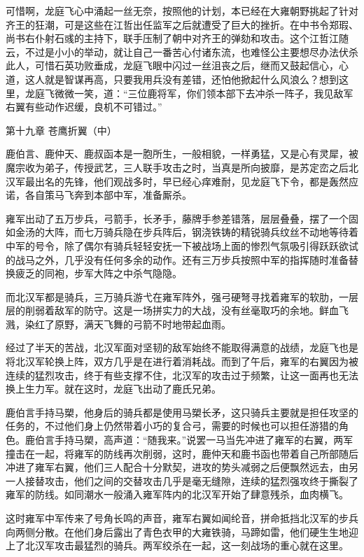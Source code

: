 可惜啊，龙庭飞心中涌起一丝无奈，按照他的计划，本已经在大雍朝野挑起了针对齐王的狂潮，可是这些在江哲出任监军之后就遭受了巨大的挫折。在中书令郑瑕、尚书右仆射石彧的主持下，联手压制了朝中对齐王的弹劾和攻击。这个江哲江随云，不过是小小的举动，就让自己一番苦心付诸东流，也难怪公主要想尽办法伏杀此人，可惜石英功败垂成，龙庭飞眼中闪过一丝沮丧之后，继而又鼓起信心，心道，这人就是智谋再高，只要我用兵没有差错，还怕他掀起什么风浪么？想到这里，龙庭飞微微一笑，道：“三位鹿将军，你们领本部下去冲杀一阵子，我见敌军右翼有些动作迟缓，良机不可错过。”

第十九章    苍鹰折翼（中）

鹿伯言、鹿仲天、鹿叔函本是一胞所生，一般相貌，一样勇猛，又是心有灵犀，被魔宗收为弟子，传授武艺，三人联手攻击之时，当真是所向披靡，是苏定峦之后北汉军最出名的先锋，他们观战多时，早已经心痒难耐，见龙庭飞下令，都是轰然应诺，各自策马飞奔到本部中军，准备厮杀。

雍军出动了五万步兵，弓箭手，长矛手，藤牌手参差错落，层层叠叠，摆了一个固如金汤的大阵，而七万骑兵隐在步兵阵后，钢浇铁铸的精锐骑兵纹丝不动地等待着中军的号令，除了偶尔有骑兵轻轻安抚一下被战场上面的惨烈气氛吸引得跃跃欲试的战马之外，几乎没有任何多余的动作。还有三万步兵按照中军的指挥随时准备替换疲乏的同袍，步军大阵之中杀气隐隐。

而北汉军都是骑兵，三万骑兵游弋在雍军阵外，强弓硬弩寻找着雍军的软肋，一层层的削弱着敌军的防守。这是一场拼实力的大战，没有丝毫取巧的余地。鲜血飞溅，染红了原野，满天飞舞的弓箭不时地带起血雨。

经过了半天的苦战，北汉军面对坚韧的敌军始终不能取得满意的战绩，龙庭飞也是将北汉军轮换上阵，双方几乎是在进行着消耗战。而到了午后，雍军的右翼因为被连续的猛烈攻击，终于有些支撑不住，北汉军的攻击过于频繁，让这一面再也无法换上生力军。就在这时，龙庭飞出动了鹿氏兄弟。

鹿伯言手持马槊，他身后的骑兵都是使用马槊长矛，这只骑兵主要就是担任攻坚的任务的，不过他们身上仍然带着小巧的复合弓，需要的时候也可以担任游猎的角色。鹿伯言手持马槊，高声道：“随我来。”说罢一马当先冲进了雍军的右翼，两军撞击在一起，将雍军的防线再次削弱，这时，鹿仲天和鹿书函也带着自己所部随后冲进了雍军右翼，他们三人配合十分默契，进攻的势头减弱之后便飘然远去，由另一人接替攻击，他们之间的交替攻击几乎是毫无缝隙，连续的猛烈强攻终于撕裂了雍军的防线。如同潮水一般涌入雍军阵内的北汉军开始了肆意残杀，血肉横飞。

这时雍军中军传来了号角长鸣的声音，雍军右翼如闻纶音，拼命抵挡北汉军的步兵向两侧分散。在他们身后露出了青色衣甲的大雍铁骑，马蹄如雷，他们硬生生地迎上了北汉军攻击最猛烈的骑兵。两军绞杀在一起，这一刻战场的重心就在这里。

